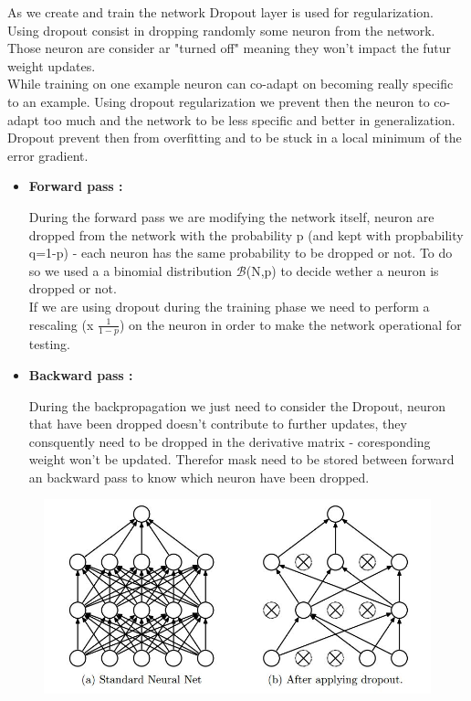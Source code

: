 As we create and train the network Dropout layer is used for regularization. 
Using dropout consist in dropping randomly some neuron from the network. 
Those neuron are consider ar "turned off" meaning they won't impact the futur weight updates. \\
While training on one example neuron can co-adapt on becoming really specific to an example. 
Using dropout regularization we prevent then the neuron to co-adapt too much and the network to be less specific and better in generalization. 
Dropout prevent then from overfitting and to be stuck in a local minimum of the error gradient.

\begin{itemize}
\item \textbf{Forward pass :} 

During the forward pass we are modifying the network itself, neuron are dropped from the network with the probability p (and kept with propbability q=1-p) - each neuron has the same probability to be dropped or not. 
To do so we used a a binomial distribution $\mathcal{B}$(N,p) to decide wether a neuron is dropped or not.\\
If we are using dropout during the training phase we need to perform a rescaling (x $\frac{1}{1-p}$) on the neuron in order to make the network operational for testing. 


\item \textbf{Backward pass :} 

During the backpropagation we just need to consider the Dropout, neuron that have been dropped doesn't contribute to further updates, they consquently need to be dropped in the derivative matrix - coresponding weight won't be updated. Therefor mask need to be stored between forward an backward pass to know which neuron have been dropped.

\end{itemize}


\begin{figure}[!ht]
    \centering
    {{\includegraphics[scale = 0.50]{src/diagrams/dropout.png}}}  
\end{figure}

